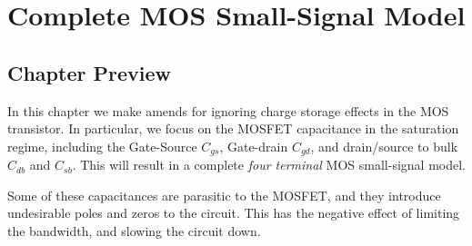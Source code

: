 \chapter{Complete MOS Small-Signal Model}
\label{ch:ch10_mos_ss_ac}
\graphicspath{{./figures/figs_ch10_mos_ss_ac/}}
\section{Chapter Preview}
In this chapter we make amends for ignoring charge storage effects in the MOS transistor.  In particular, we focus on the MOSFET capacitance in the saturation regime, including the Gate-Source $C_{gs}$, Gate-drain $C_{gd}$, and drain/source to bulk $C_{db}$ and $C_{sb}$.  This will result in a complete \emph{four terminal} MOS small-signal model.

Some of these capacitances are parasitic to the MOSFET, and they introduce undesirable poles and zeros to the circuit.  This has the negative effect of limiting the bandwidth, and slowing the circuit down.

